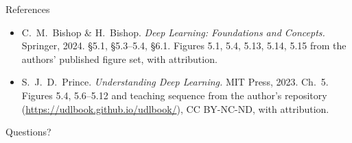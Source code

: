 \documentclass[aspectratio=169, 11pt]{beamer}
\begin{document}
\begin{frame}{References}
  \footnotesize
  \begin{itemize}
    \item C.~M.~Bishop \& H.~Bishop. \textit{Deep
          Learning: Foundations and Concepts.} Springer,
          2024. \S5.1, \S5.3--5.4, \S6.1. Figures 5.1,
          5.4, 5.13, 5.14, 5.15 from the authors'
          published figure set, with attribution.
    \item S.~J.~D.~Prince. \textit{Understanding Deep
          Learning.} MIT Press, 2023. Ch.~5. Figures 5.4,
          5.6--5.12 and teaching sequence from the
          author's repository
          (\url{https://udlbook.github.io/udlbook/}),
          CC BY-NC-ND, with attribution.
  \end{itemize}
\end{frame}

\begin{frame}[standout]
  Questions?
\end{frame}
\end{document}
